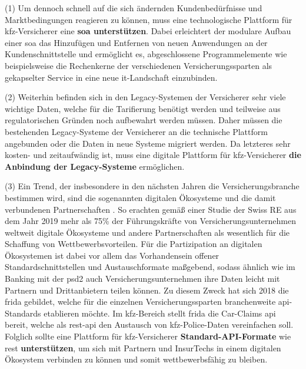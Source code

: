 
(1) Um dennoch schnell auf die sich ändernden Kundenbedürfnisse und Marktbedingungen reagieren zu können, muss eine technologische Plattform für \ac{kfz}-Versicherer eine \textbf{\ac{soa} unterstützen}. Dabei erleichtert der modulare Aufbau einer \ac{soa} das Hinzufügen und Entfernen von neuen Anwendungen an der Kundenschnittstelle \autocite[Vgl.][S. 392]{WARG2016} und ermöglicht es, abgeschlossene Programmelemente wie beispielsweise die Rechenkerne der verschiedenen Versicherungssparten als gekapselter Service in eine neue \ac{it}-Landschaft einzubinden. \autocite[Vgl.][S. 10f]{URLA2019}

(2) Weiterhin befinden sich in den Legacy-Systemen der Versicherer sehr viele wichtige Daten, welche für die Tarifierung benötigt werden und teilweise aus regulatorischen Gründen noch aufbewahrt werden müssen. Daher müssen die bestehenden Legacy-Systeme der Versicherer an die technische Plattform angebunden oder die Daten in neue Systeme migriert werden. Da letzteres sehr kosten- und zeitaufwändig ist, muss eine digitale Plattform für \ac{kfz}-Versicherer \textbf{die Anbindung der Legacy-Systeme} ermöglichen. \autocite[Vgl.][S. 10-12]{GUNTER2020}

(3) Ein Trend, der insbesondere in den nächsten Jahren die Versicherungsbranche bestimmen wird, sind die sogenannten digitalen Ökosysteme und die damit verbundenen Partnerschaften \autocite[Vgl.][]{AVRAMAKIS2023}. So erachten gemäß einer Studie der Swiss RE aus dem Jahr 2019 mehr als 75\% der Führungskräfte von Versicherungsunternehmen weltweit digitale Ökosysteme und andere Partnerschaften als wesentlich für die Schaffung von Wettbewerbsvorteilen. \autocite[Vgl.][]{PAYNE2022} Für die Partizipation an digitalen Ökosystemen ist dabei vor allem das Vorhandensein offener Standardschnittstellen und Austauschformate maßgebend, sodass ähnlich wie im Banking mit der \ac{psd2} auch Versicherungsunternehmen ihre Daten leicht mit Partnern und Drittanbietern teilen können. Zu diesem Zweck hat sich 2018 die \ac{frida} gebildet, welche für die einzelnen Versicherungssparten branchenweite \ac{api}-Standards etablieren möchte.\autocite[Vgl.][]{2021z} Im \ac{kfz}-Bereich stellt \ac{frida} die Car-Claims \ac{api} bereit, welche als \ac{rest}-\ac{api} den Austausch von \ac{kfz}-Police-Daten vereinfachen soll. Folglich sollte eine Plattform für \ac{kfz}-Versicherer \textbf{Standard-API-Formate} wie \ac{rest} \textbf{unterstützen}, um sich mit Partnern und InsurTechs in einem digitalen Ökosystem verbinden zu können und somit wettbewerbsfähig zu bleiben. \autocite[Vgl.][]{KRETZ2023}

